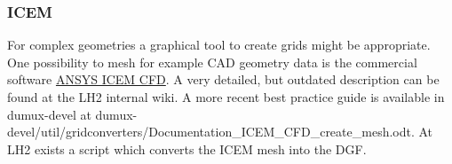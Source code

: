 \subsubsection{ICEM}
For complex geometries a graphical tool to create grids might be appropriate. One possibility to mesh for example CAD
geometry data is the commercial software \href{http://www.ansys.com/Products/Other+Products/ANSYS+ICEM+CFD/}{ANSYS ICEM
CFD}. A very detailed, but outdated description can be found at the LH2 internal wiki. A more recent best practice guide is available
in dumux-devel at dumux-devel/util/gridconverters/Documentation\_ICEM\_CFD\_create\_mesh.odt. At LH2 exists a script which converts the ICEM mesh into the DGF.

